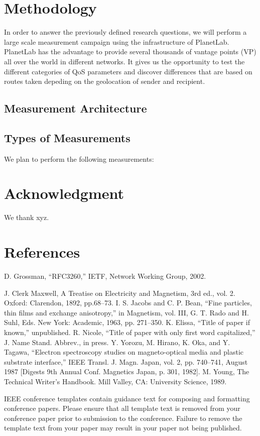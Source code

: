 \documentclass[conference]{IEEEtran}
\begin{document}
\section{Methodology}

In order to answer the previously defined research questions, we will perform a large scale measurement campaign using the infrastructure of PlanetLab. PlanetLab has the advantage to provide several thousands of vantage points (VP) all over the world in different networks. It gives us the opportunity to test the different categories of QoS parameters and discover differences that are based on routes taken depeding on the geolocation of sender and recipient.

\subsection{Measurement Architecture}


\subsection{Types of Measurements}

We plan to perform the following measurements:






\section*{Acknowledgment}

We thank xyz.

\section*{References}


\begin{thebibliography}{00}
 D. Grossman, ``RFC3260,'' IETF, Network Working Group, 2002.


 J. Clerk Maxwell, A Treatise on Electricity and Magnetism, 3rd ed., vol. 2. Oxford: Clarendon, 1892, pp.68--73.
 I. S. Jacobs and C. P. Bean, ``Fine particles, thin films and exchange anisotropy,'' in Magnetism, vol. III, G. T. Rado and H. Suhl, Eds. New York: Academic, 1963, pp. 271--350.
 K. Elissa, ``Title of paper if known,'' unpublished.
 R. Nicole, ``Title of paper with only first word capitalized,'' J. Name Stand. Abbrev., in press.
 Y. Yorozu, M. Hirano, K. Oka, and Y. Tagawa, ``Electron spectroscopy studies on magneto-optical media and plastic substrate interface,'' IEEE Transl. J. Magn. Japan, vol. 2, pp. 740--741, August 1987 [Digests 9th Annual Conf. Magnetics Japan, p. 301, 1982].
 M. Young, The Technical Writer's Handbook. Mill Valley, CA: University Science, 1989.
\end{thebibliography}
\vspace{12pt}
\color{red}
IEEE conference templates contain guidance text for composing and formatting conference papers. Please ensure that all template text is removed from your conference paper prior to submission to the conference. Failure to remove the template text from your paper may result in your paper not being published.
\end{document}
